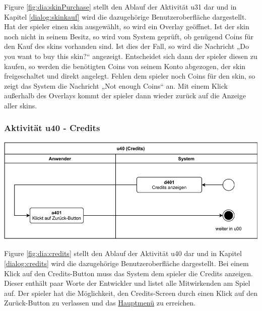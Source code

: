 Figure \ref{fig:dia:skinPurchase} stellt den Ablauf der Aktivität u31 dar und in Kapitel \ref{dialog:skinkauf} wird die dazugehörige Benutzeroberfläche dargestellt.
Hat der \gls{spieler} einen \gls{skin} ausgewählt, so wird ein Overlay geöffnet. Ist der \gls{skin} noch nicht in seinem Besitz, so wird vom System geprüft, ob genügend Coins für den Kauf des \glspl{skin} vorhanden sind. Ist dies der Fall, so wird die Nachricht „Do you want to buy this skin?“ angezeigt. Entscheidet sich dann der \gls{spieler} diesen zu kaufen, so werden die benötigten Coins von seinem Konto abgezogen, der \gls{skin} freigeschaltet und direkt angelegt. 
Fehlen dem \gls{spieler} noch Coins für den \gls{skin}, so zeigt das System die Nachricht „Not enough Coins“ an. Mit einem Klick außerhalb des Overlays kommt der \gls{spieler} dann wieder zurück auf die Anzeige aller \glspl{skin}.

\clearpage

\subsubsection{Aktivität u40 - Credits}

\vspace*{1cm}

\includegraphics[width=\linewidth]{diagramme/pdf/UML-Activity-u40.pdf}
\label{fig:dia:credits}
\vspace*{0.5cm}

Figure \ref{fig:dia:credits} stellt den Ablauf der Aktivität u40 dar und in Kapitel \ref{dialog:credits} wird die dazugehörige Benutzeroberfläche dargestellt.
Bei einem Klick auf den Credits-Button muss das System dem \gls{spieler} die Credits anzeigen. 
Dieser enthält paar Worte der Entwickler und listet alle Mitwirkenden am Spiel auf. 
Der \gls{spieler} hat die Möglichkeit, den Credits-Screen durch einen Klick auf den Zurück-Button zu verlassen und das \hyperref[fig:dia:mainMenu]{Hauptmenü} zu erreichen.

\clearpage
